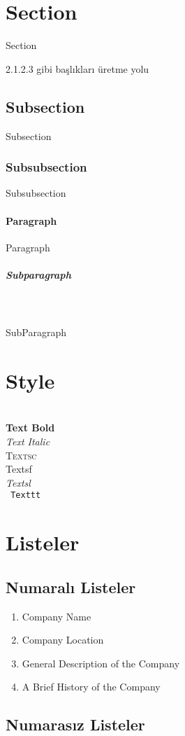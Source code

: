 \section{Section}
\- \indent Section

	2.1.2.3 gibi başlıkları üretme yolu
\subsection{Subsection}
\- \indent Subsection
\subsubsection{Subsubsection}
\- \indent Subsubsection
\paragraph{Paragraph}
\- \indent Paragraph
\subparagraph{Subparagraph}
\- \\ \\ \indent SubParagraph


\section{Style}
\-
\\
\textbf{ Text Bold} 
\\
\textit{ Text Italic} 
\\
\textsc{ Textsc }
\\
\textsf{ Textsf }
\\
\textsl{ Textsl }
\\
\texttt{ Texttt }


\section{Listeler}

\subsection{Numaralı Listeler}

\begin{enumerate}
\item Company Name
\item Company Location
\item General Description of the Company
\item A Brief History of the Company
\end{enumerate}

\subsection{Numarasız Listeler}

